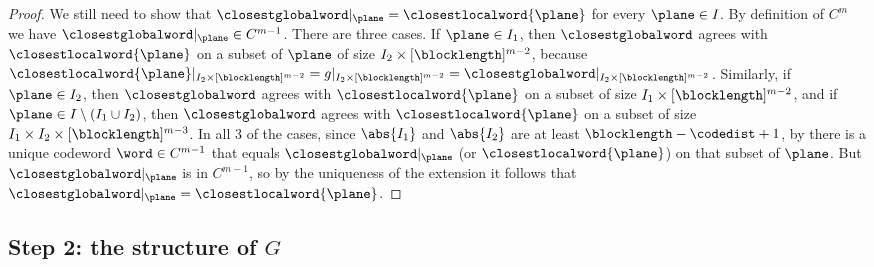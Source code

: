 \documentclass{toc}
\theoremstyle{plain}
\begin{document}
\begin{proof}
We still need to show that $\closestglobalword \vert_{\plane} = \closestlocalword{\plane}$ for every $\plane \in I$. By definition of $C^m$ we have $\closestglobalword \vert_{\plane} \in C^{m-1}$. There are three cases. If $\plane \in I_1$, then $\closestglobalword$ agrees with $\closestlocalword{\plane}$ on a subset of $\plane$ of size $I_2 \times [\blocklength]^{m-2}$, because $\closestlocalword{\plane} \vert_{I_2 \times [\blocklength]^{m-2}} = g \vert_{I_2 \times [\blocklength]^{m-2}} = \closestglobalword \vert_{I_2 \times [\blocklength]^{m-2}}$. Similarly, if $\plane \in I_2$, then $\closestglobalword$ agrees with $\closestlocalword{\plane}$ on a subset of size $I_1 \times [\blocklength]^{m-2}$, and if $\plane \in I \setminus (I_1 \cup I_2)$, then $\closestglobalword$ agrees with $\closestlocalword{\plane}$ on a subset of size $I_1 \times I_2 \times [\blocklength]^{m-3}$.
In all $3$ of the cases, since $\abs{I_1}$ and $\abs{I_2}$ are at least $\blocklength - \codedist + 1$, by
 there is a unique codeword $\word \in C^{m-1}$ that equals $\closestglobalword \vert_{\plane}$ (or $\closestlocalword{\plane}$) on that subset of $\plane$. But $\closestglobalword \vert_{\plane}$ is in $C^{m-1}$, so by the uniqueness of the extension it follows that $\closestglobalword \vert_{\plane} = \closestlocalword{\plane}$.
\end{proof}

%
%
\subsection{Step 2: the structure of \texorpdfstring{$G$}{G}}
\end{document}
